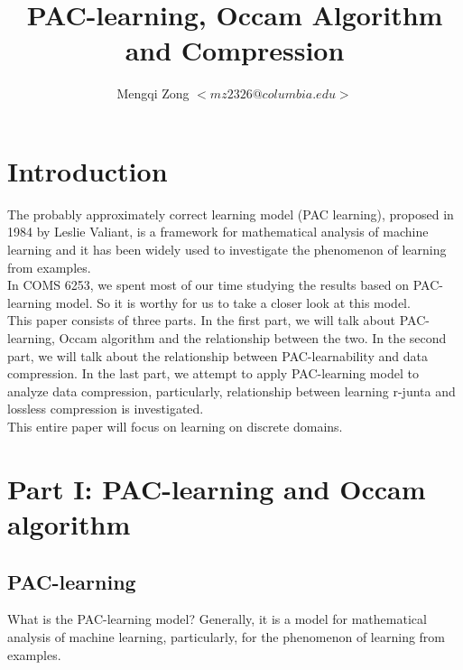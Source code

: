 \documentclass[12pt]{article}
\title{PAC-learning, Occam Algorithm and Compression}
\author{Mengqi Zong $<mz2326@columbia.edu>$}
\begin{document}
\maketitle

\setlength{\parindent}{0in}

\thispagestyle{plain}

\section{Introduction}


The probably approximately correct learning model (PAC learning), proposed in 1984 by Leslie Valiant, is a framework for mathematical analysis of machine learning and it has been widely used to investigate the phenomenon of learning from examples. \\

In COMS 6253, we spent most of our time studying the results based on PAC-learning model. So it is worthy for us to take a closer look at this model. \\

This paper consists of three parts. In the first part, we will talk about PAC-learning, Occam algorithm and the relationship between the two. In the second part, we will talk about the relationship between PAC-learnability and data compression. In the last part, we attempt to apply PAC-learning model to analyze data compression, particularly, relationship between learning r-junta and lossless compression is investigated. \\

This entire paper will focus on learning on discrete domains. 


\section{Part I: PAC-learning and Occam algorithm}

\subsection{PAC-learning}


What is the PAC-learning model? Generally, it is a model for mathematical analysis of machine learning, particularly, for the phenomenon of learning from examples. \\
\end{document}
